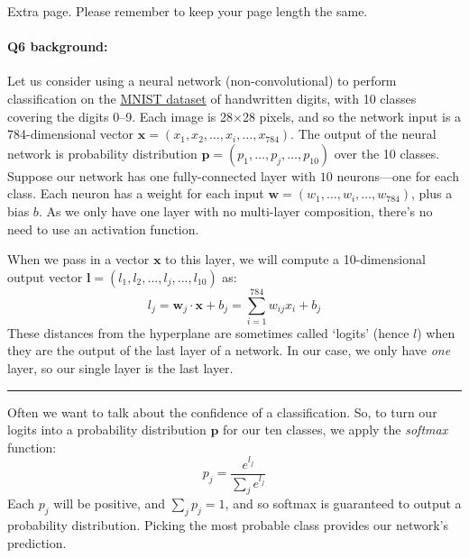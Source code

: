 





\pagebreak
Extra page. Please remember to keep your page length the same.



\pagebreak
\paragraph{Q6 background:}
Let us consider using a neural network (non-convolutional) to perform classification on the \href{http://yann.lecun.com/exdb/mnist/}{MNIST dataset} of handwritten digits, with 10 classes covering the digits 0--9. Each image is 28$\times$28 pixels, and so the network input is a 784-dimensional vector $\mathbf{x}=(x_1,x_2,\dots,x_i,\dots,x_{784})$. The output of the neural network is probability distribution $\mathbf{p}=(p_1,\dots,p_j,\dots,p_{10})$ over the 10 classes. Suppose our network has one fully-connected layer with $10$ neurons---one for each class. Each neuron has a weight for each input $\mathbf{w}=(w_1,\dots,w_i,\dots,w_{784})$, plus a bias $b$. As we only have one layer with no multi-layer composition, there's no need to use an activation function.

When we pass in a vector $\mathbf{x}$ to this layer, we will compute a 10-dimensional output vector $\mathbf{l}=(l_1,l_2,...,l_j,...,l_{10})$ as:
\begin{equation}
    l_j = \mathbf{w}_j \cdot \mathbf{x} + b_j = \sum_{i=1}^{784}w_{ij}x_i + b_j
\end{equation}
These distances from the hyperplane are sometimes called `logits' (hence $l$) when they are the output of the last layer of a network. In our case, we only have \emph{one} layer, so our single layer is the last layer.

\hspace{\fill}\rule{0.5\linewidth}{.5pt}\hspace{\fill}

Often we want to talk about the confidence of a classification. So, to turn our logits into a probability distribution $\mathbf{p}$ for our ten classes, we apply the \emph{softmax} function:
\begin{equation}
    p_j = \frac{e^{l_j}}{\sum_je^{l_j}}
   \label{eq:softmax}
\end{equation}
Each $p_j$ will be positive, and $\sum_jp_j = 1$, and so softmax is guaranteed to output a probability distribution. Picking the most probable class provides our network's prediction.

